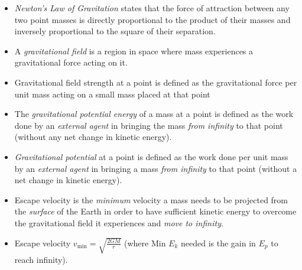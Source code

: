 \documentclass[oneside]{book}
\begin{document}
\begin{itemize}
    \item \emph{Newton's Law of Gravitation} states that the force of attraction between any two point masses is directly proportional to the product of their masses and inversely proportional to the square of their separation.
    \item A \emph{gravitational field} is a region in space where mass experiences a gravitational force acting on it.
    \item Gravitational field strength at a point is defined as the gravitational force per unit mass acting on a small mass placed at that point
    \item The \emph{gravitational potential energy} of a mass at a point is defined as the work done by an \emph{external agent} in bringing the mass \emph{from infinity} to that point (without any net change in kinetic energy).
    \item \emph{Gravitational potential} at a point is defined as the work done per unit mass by an \emph{external agent} in bringing a mass \emph{from infinity} to that point (without a net change in kinetic energy).
    \item Escape velocity is the \emph{minimum} velocity a mass needs to be projected from the \emph{surface} of the Earth in order to have sufficient kinetic energy to overcome the gravitational field it experiences and \emph{move to infinity}.
    \item Escape velocity \(v_\text{min}=\sqrt{\frac{2GM}{r}}\) (where Min \(E_k\) needed is the gain in \(E_p\) to reach infinity).
\end{itemize}
\end{document}
